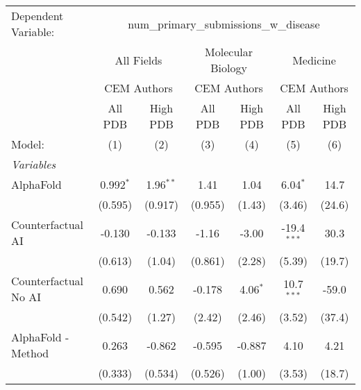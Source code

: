 \begingroup
\centering
\begin{tabular}{lcccccc}
   \tabularnewline \midrule \midrule
   Dependent Variable: & \multicolumn{6}{c}{num\_primary\_submissions\_w\_disease}\\
 & \multicolumn{2}{c}{All Fields} & \multicolumn{2}{c}{Molecular Biology} & \multicolumn{2}{c}{Medicine} \\
\cmidrule(lr){2-3} \cmidrule(lr){4-5} \cmidrule(lr){6-7}
 & \multicolumn{2}{c}{CEM Authors} & \multicolumn{2}{c}{CEM Authors} & \multicolumn{2}{c}{CEM Authors} \\
\cmidrule(lr){2-3} \cmidrule(lr){4-5} \cmidrule(lr){6-7}
 & \multicolumn{1}{c}{All PDB} & \multicolumn{1}{c}{High PDB} & \multicolumn{1}{c}{All PDB} & \multicolumn{1}{c}{High PDB} & \multicolumn{1}{c}{All PDB} & \multicolumn{1}{c}{High PDB} \\
\cmidrule(lr){2-2} \cmidrule(lr){3-3} \cmidrule(lr){4-4} \cmidrule(lr){5-5} \cmidrule(lr){6-6} \cmidrule(lr){7-7}
   Model:                                                     & (1)          & (2)         & (3)         & (4)        & (5)            & (6)\\  
   \midrule
   \emph{Variables}\\
   AlphaFold                                                  & 0.992$^{*}$  & 1.96$^{**}$ & 1.41        & 1.04       & 6.04$^{*}$     & 14.7\\   
                                                              & (0.595)      & (0.917)     & (0.955)     & (1.43)     & (3.46)         & (24.6)\\   
   Counterfactual AI                                          & -0.130       & -0.133      & -1.16       & -3.00      & -19.4$^{***}$  & 30.3\\   
                                                              & (0.613)      & (1.04)      & (0.861)     & (2.28)     & (5.39)         & (19.7)\\   
   Counterfactual No AI                                       & 0.690        & 0.562       & -0.178      & 4.06$^{*}$ & 10.7$^{***}$   & -59.0\\   
                                                              & (0.542)      & (1.27)      & (2.42)      & (2.46)     & (3.52)         & (37.4)\\   
   AlphaFold - Method                                         & 0.263        & -0.862      & -0.595      & -0.887     & 4.10           & 4.21\\   
                                                              & (0.333)      & (0.534)     & (0.526)     & (1.00)     & (3.53)         & (18.7)\\   

\end{tabular}
